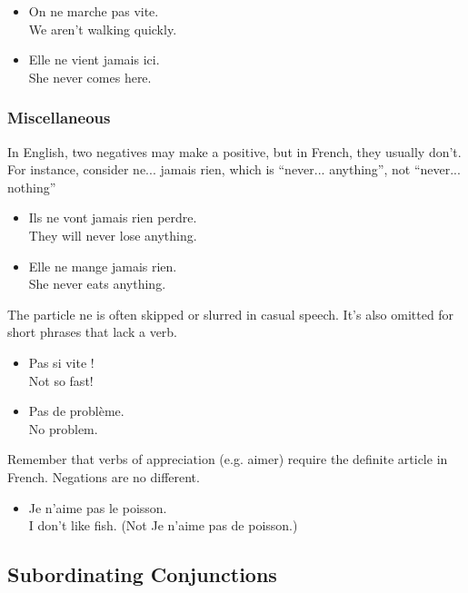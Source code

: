 \begin{itemize}
  \item  On ne marche pas vite. \\ We aren't walking quickly.
  \item  Elle ne vient jamais ici. \\ She never comes here.
\end{itemize}

\subsubsection{Miscellaneous}

In English, two negatives may make a positive, but in French, they usually don't. For instance, consider ne... jamais rien, which is ``never... anything'', not ``never... nothing''

\begin{itemize}
  \item  Ils ne vont jamais rien perdre. \\ They will never lose anything.
  \item  Elle ne mange jamais rien. \\ She never eats anything.
\end{itemize}

The particle ne is often skipped or slurred in casual speech. It's also omitted for short phrases that lack a verb.

\begin{itemize}
  \item  Pas si vite ! \\ Not so fast!
  \item  Pas de probl{\`e}me. \\ No problem.
\end{itemize}

Remember that verbs of appreciation (e.g. aimer) require the definite article in French. Negations are no different.

\begin{itemize}
  \item  Je n'aime pas le poisson. \\ I don't like fish. (Not Je n'aime pas de poisson.)
\end{itemize}


\pagebreak
\subsection{Subordinating Conjunctions}


